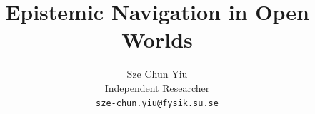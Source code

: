 \documentclass[11pt]{article}
\title{Epistemic Navigation in Open Worlds}
\author{Sze Chun Yiu\\Independent Researcher\\\texttt{sze-chun.yiu@fysik.su.se}}
\date{}
\begin{document}
\maketitle










\nocite{*}


\end{document}
